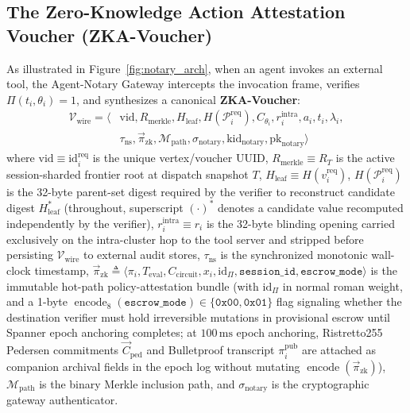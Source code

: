 \documentclass[conference,10pt]{IEEEtran}
\begin{document}
\subsection{The Zero-Knowledge Action Attestation Voucher (ZKA-Voucher)}
As illustrated in Figure~\ref{fig:notary_arch}, when an agent invokes an external tool, the Agent-Notary Gateway intercepts the invocation frame, verifies $\Pi(t_i, \theta_i) = 1$, and synthesizes a canonical \textbf{ZKA-Voucher}:
\begin{equation}
\begin{split}
\mathcal{V}_{\text{wire}} = \langle &\text{vid}, R_{\text{merkle}}, H_{\text{leaf}}, H(\mathcal{P}_i^{\text{req}}), C_{\theta_i}, r_i^{\text{intra}}, a_i, t_i, \lambda_i, \\
&\tau_{\text{ns}}, \vec{\pi}_{\text{zk}}, \mathcal{M}_{\text{path}}, \sigma_{\text{notary}}, \text{kid}_{\text{notary}}, \text{pk}_{\text{notary}} \rangle
\end{split}
\end{equation}
where $\text{vid} \equiv \text{id}_i^{\text{req}}$ is the unique vertex/voucher UUID, $R_{\text{merkle}} \equiv R_T$ is the active session-sharded frontier root at dispatch snapshot $T$, $H_{\text{leaf}} \equiv H(v_i^{\text{req}})$, $H(\mathcal{P}_i^{\text{req}})$ is the 32-byte parent-set digest required by the verifier to reconstruct candidate digest $H_{\text{leaf}}^*$ (throughout, superscript $(\cdot)^*$ denotes a candidate value recomputed independently by the verifier), $r_i^{\text{intra}} \equiv r_i$ is the 32-byte blinding opening carried exclusively on the intra-cluster hop to the tool server and stripped before persisting $\mathcal{V}_{\text{wire}}$ to external audit stores, $\tau_{\text{ns}}$ is the synchronized monotonic wall-clock timestamp, $\vec{\pi}_{\text{zk}} \triangleq \langle \pi_i, T_{\text{eval}}, C_{\text{circuit}}, x_i, \mathrm{id}_{\Pi}, \texttt{session\_id}, \texttt{escrow\_mode} \rangle$ is the immutable hot-path policy-attestation bundle (with $\mathrm{id}_{\Pi}$ in normal roman weight, and a 1-byte $\operatorname{encode}_8(\texttt{escrow\_mode}) \in \{\mathtt{0x00},\mathtt{0x01}\}$ flag signaling whether the destination verifier must hold irreversible mutations in provisional escrow until Spanner epoch anchoring completes; at $100\,\text{ms}$ epoch anchoring, Ristretto255 Pedersen commitments $\vec{C}_{\text{ped}}$ and Bulletproof transcript $\pi_i^{\text{pub}}$ are attached as companion archival fields in the epoch log without mutating $\operatorname{encode}(\vec{\pi}_{\text{zk}})$), $\mathcal{M}_{\text{path}}$ is the binary Merkle inclusion path, and $\sigma_{\text{notary}}$ is the cryptographic gateway authenticator.
\end{document}

